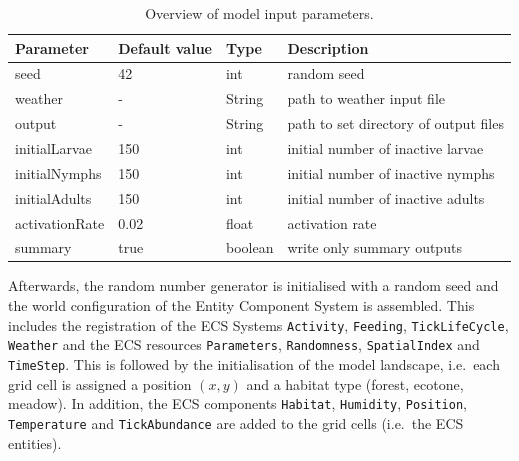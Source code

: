 \documentclass[a4paper, 11pt]{scrartcl}
\newcommand{\inlinecode}[1]{\texttt{\small #1}}
\begin{document}
\begin{table}[h!]
\caption[Overview of model input parameters.]{Overview of model input parameters.}
\label{tab:initialisation_parameters}
\begin{tabularx}{\textwidth}{llll}
\toprule
\textbf{Parameter} & \textbf{Default value} & \textbf{Type} & \textbf{Description} \\
\midrule
seed    			& 42    & int     & random seed \\
weather     		& -     & String  & path to weather input file \\
output     			& -     & String  & path to set directory of output files \\
initialLarvae       & 150   & int     & initial number of inactive larvae \\
initialNymphs       & 150   & int     & initial number of inactive nymphs \\
initialAdults       & 150   & int     & initial number of inactive adults \\
activationRate      & 0.02  & float   & activation rate  \\
summary       		& true & boolean  & write only summary outputs \\
\bottomrule
\end{tabularx}
\end{table}

Afterwards, the random number generator is initialised with a random seed and the world configuration of the Entity Component System is assembled. This includes the registration of the ECS Systems \inlinecode{Activity}, \inlinecode{Feeding}, \inlinecode{TickLifeCycle}, \inlinecode{Weather} and the ECS resources \inlinecode{Parameters}, \inlinecode{Randomness}, \inlinecode{SpatialIndex} and \inlinecode{TimeStep}. This is followed by the initialisation of the model landscape, i.e.\ each grid cell is assigned a position $(x, y)$ and a habitat type (forest, ecotone, meadow). In addition, the ECS components \inlinecode{Habitat}, \inlinecode{Humidity}, \inlinecode{Position}, \inlinecode{Temperature} and \inlinecode{TickAbundance} are added to the grid cells (i.e.\ the ECS entities).
\end{document}
